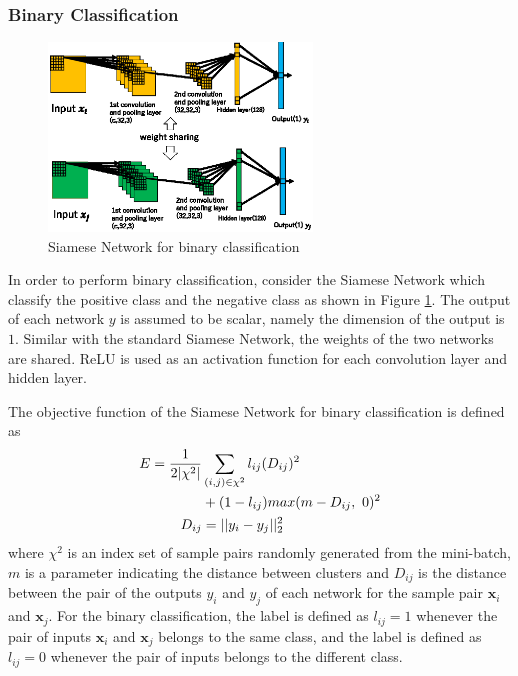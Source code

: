 \documentclass[twocolumn,10pt]{article}
\begin{document}
\subsubsection{Binary Classification}
\begin{figure}[ht]
\begin{center}
\includegraphics[width=70mm]{figure2.eps}
\caption{Siamese Network for binary classification}
\label{fig:siamese-bi}
\end{center}
\end{figure}

In order to perform binary classification, consider the Siamese Network which classify the positive class and the negative class as shown in Figure \ref{fig:siamese-bi}.
The output of each network $y$ is assumed to be scalar, namely the dimension of the output is $1$.
Similar with the standard Siamese Network, the weights of the two networks are shared.
ReLU is used as an activation function for each convolution layer and hidden layer.


The objective function of the Siamese Network for binary classification is defined as
\begin{align}
E=\frac{1}{2|\chi^2|}&\sum_{(i,j) \in \chi^2} l_{ij}(D_{ij})^2 \notag \\
&+ (1-l_{ij})max(m-D_{ij}, ~0)^2 \\
D_{ij}&=||y_{i}- y_{j}||^2_2
\label{eq:siamese-dis}
\end{align}
where $\chi^2$ is an index set of sample pairs randomly generated from the mini-batch, $m$ is a parameter indicating the distance between clusters and 
$D_{ij}$ is the distance between the pair of the outputs $y_i$ and $y_j$ of each network for the sample pair $\bm{x}_i$ and $\bm{x}_j$.
For the binary classification, the label is defined as $l_{ij}=1$ whenever the pair of inputs ${\bm x_i}$ and ${\bm x_j}$ belongs to the same class, and the label is defined as $l_{ij}=0$ whenever the pair of inputs belongs to the different class.

\end{document}
